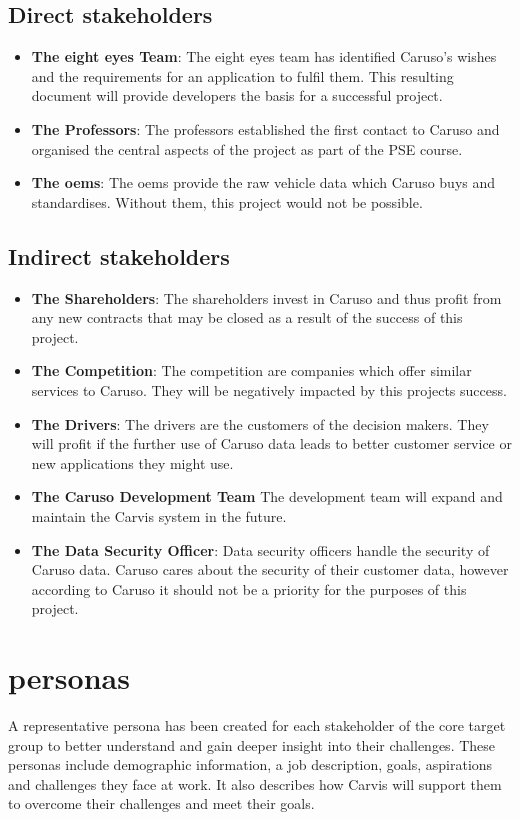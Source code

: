 \subsection{Direct \Glspl{stakeholder}}
\begin{itemize}
  \item \textbf{The eight eyes Team}: The eight eyes team has identified Caruso's wishes and the requirements for an application to fulfil them. This resulting document will provide developers the basis for a successful project.
  \item \textbf{The Professors}: The professors established the first contact to Caruso and organised the central aspects of the project as part of the PSE course.
  \item \textbf{The \glspl{oem}}: The \glspl{oem} provide the raw vehicle data which Caruso buys and standardises. Without them, this project would not be possible.
\end{itemize}

\subsection{Indirect \Glspl{stakeholder}}
\begin{itemize}
  \item \textbf{The Shareholders}: The shareholders invest in Caruso and thus profit from any new contracts that may be closed as a result of the success of this project.
  \item \textbf{The Competition}: The competition are companies which offer similar services to Caruso. They will be negatively impacted by this projects success.
  \item \textbf{The Drivers}: The drivers are the customers of the decision makers. They will profit if the further use of Caruso data leads to better customer service or new applications they might use.
  \item \textbf{The Caruso Development Team} The development team will expand and maintain the Carvis system in the future.
  \item \textbf{The Data Security Officer}: Data security officers handle the security of Caruso data. Caruso cares about the security of their customer data, however according to Caruso it should not be a priority for the purposes of this project.
\end{itemize}

\section{\Glspl{persona}}
A representative \gls{persona} has been created for each \gls{stakeholder} of the core target group to better understand and gain deeper insight into their challenges. These \glspl{persona} include demographic information, a job description, goals, aspirations and challenges they face at work. It also describes how Carvis will support them to overcome their challenges and meet their goals.


